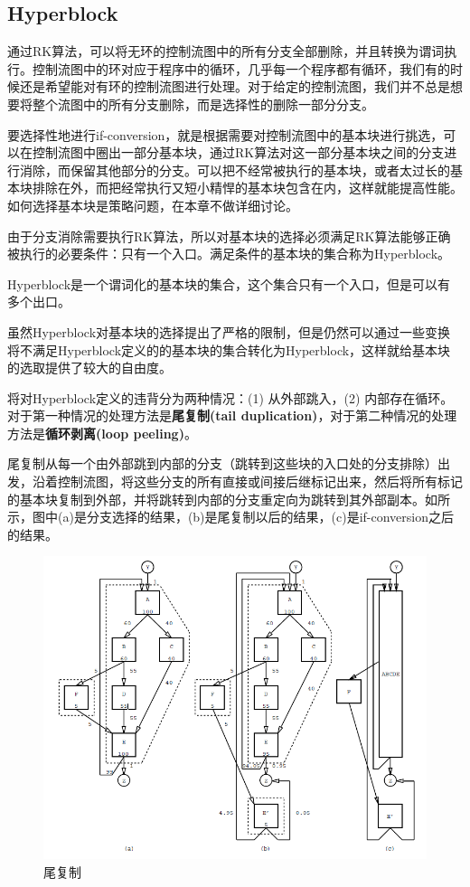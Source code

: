 \subsection{Hyperblock}

通过RK算法，可以将无环的控制流图中的所有分支全部删除，并且转换为谓词执行。控制流图中的环对应于程序中的循环，几乎每一个程序都有循环，我们有的时候还是希望能对有环的控制流图进行处理。对于给定的控制流图，我们并不总是想要将整个流图中的所有分支删除，而是选择性的删除一部分分支。

要选择性地进行if-conversion，就是根据需要对控制流图中的基本块进行挑选，可以在控制流图中圈出一部分基本块，通过RK算法对这一部分基本块之间的分支进行消除，而保留其他部分的分支。可以把不经常被执行的基本块，或者太过长的基本块排除在外，而把经常执行又短小精悍的基本块包含在内，这样就能提高性能。如何选择基本块是策略问题，在本章不做详细讨论。

由于分支消除需要执行RK算法，所以对基本块的选择必须满足RK算法能够正确被执行的必要条件：只有一个入口。满足条件的基本块的集合称为Hyperblock。
\begin{definition}[Hyperblock]
Hyperblock是一个谓词化的基本块的集合，这个集合只有一个入口，但是可以有多个出口。
\end{definition}

虽然Hyperblock对基本块的选择提出了严格的限制，但是仍然可以通过一些变换将不满足Hyperblock定义的的基本块的集合转化为Hyperblock，这样就给基本块的选取提供了较大的自由度。

将对Hyperblock定义的违背分为两种情况：(1) 从外部跳入，(2) 内部存在循环。对于第一种情况的处理方法是\textbf{尾复制(tail duplication)}，对于第二种情况的处理方法是\textbf{循环剥离(loop peeling)}。

尾复制从每一个由外部跳到内部的分支（跳转到这些块的入口处的分支排除）出发，沿着控制流图，将这些分支的所有直接或间接后继标记出来，然后将所有标记的基本块复制到外部，并将跳转到内部的分支重定向为跳转到其外部副本。如所示，图中(a)是分支选择的结果，(b)是尾复制以后的结果，(c)是if-conversion之后的结果。
\begin{figure}
\includegraphics[width=\linewidth]{mechanism/hyperblock-td}
\caption{\label{fig:taildup} 尾复制}
\end{figure}

